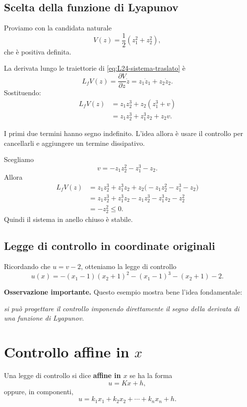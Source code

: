 \subsection{Scelta della funzione di Lyapunov}

Proviamo con la candidata naturale
\[
V(z)=\frac{1}{2}(z_1^2+z_2^2),
\]
che \`e positiva definita.

La derivata lungo le traiettorie di \eqref{eq:L24-sistema-traslato} \`e
\[
L_fV(z)=\frac{\partial V}{\partial z}\dot z
= z_1\dot z_1 + z_2\dot z_2.
\]
Sostituendo:
\begin{align*}
L_fV(z)
&= z_1 z_2^3 + z_2(z_1^3+v)\\
&= z_1 z_2^3 + z_1^3 z_2 + z_2 v.
\end{align*}

I primi due termini hanno segno indefinito. L'idea allora \`e usare il controllo per cancellarli e aggiungere un termine dissipativo.

Scegliamo
\[
v = - z_1 z_2^2 - z_1^3 - z_2.
\]
Allora
\begin{align*}
L_fV(z)
&= z_1 z_2^3 + z_1^3 z_2 + z_2\bigl(- z_1 z_2^2 - z_1^3 - z_2\bigr)\\
&= z_1 z_2^3 + z_1^3 z_2 - z_1 z_2^3 - z_1^3 z_2 - z_2^2\\
&= -z_2^2 \le 0.
\end{align*}
Quindi il sistema in anello chiuso \`e stabile.

\subsection{Legge di controllo in coordinate originali}

Ricordando che \(u=v-2\), otteniamo la legge di controllo
\[
\boxed{
u(x)=-(x_1-1)(x_2+1)^2-(x_1-1)^3-(x_2+1)-2.
}
\]

\medskip

\noindent
\textbf{Osservazione importante.}
Questo esempio mostra bene l'idea fondamentale:
\begin{center}
\emph{si pu\`o progettare il controllo imponendo direttamente il segno della derivata di una funzione di Lyapunov.}
\end{center}

\section{Controllo affine in \(x\)}

Una legge di controllo si dice \textbf{affine in \(x\)} se ha la forma
\[
u = Kx + h,
\]
oppure, in componenti,
\[
u = k_1 x_1 + k_2 x_2 + \cdots + k_n x_n + h.
\]

